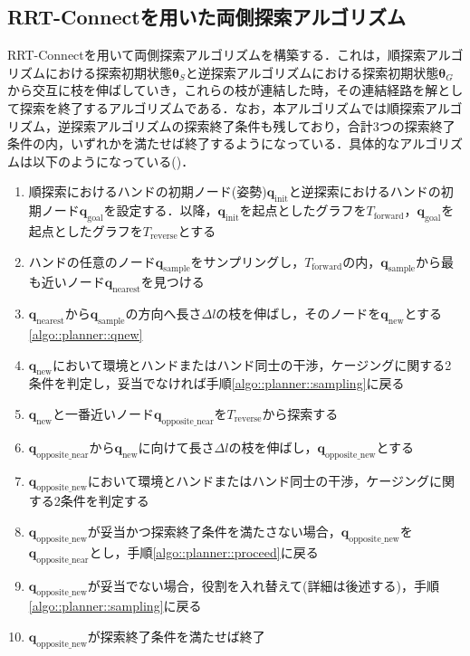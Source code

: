 \documentclass[a4paper,twoside,12pt,papersize, dvipdfmx]{iirthesis}
\begin{document}
{\subsection{RRT-Connectを用いた両側探索アルゴリズム}
RRT-Connect\cite{kuffner2000}を用いて両側探索アルゴリズムを構築する．これは，順探索アルゴリズムにおける探索初期状態$\bm {\theta}_S$と逆探索アルゴリズムにおける探索初期状態$\bm {\theta}_G$から交互に枝を伸ばしていき，これらの枝が連結した時，その連結経路を解として探索を終了するアルゴリズムである．なお，本アルゴリズムでは順探索アルゴリズム，逆探索アルゴリズムの探索終了条件も残しており，合計3つの探索終了条件の内，いずれかを満たせば終了するようになっている．具体的なアルゴリズムは以下のようになっている(\figref{})．
\begin{enumerate}
\item 順探索におけるハンドの初期ノード(姿勢)$\bm{q}_{\mathrm {init}}$と逆探索におけるハンドの初期ノード$\bm{q}_{\mathrm {goal}}$を設定する．以降，$\bm{q}_{\mathrm {init}}$を起点としたグラフを$T_{\mathrm {forward}}$，$\bm{q}_{\mathrm {goal}}$を起点としたグラフを$T_{\mathrm {reverse}}$とする
\item ハンドの任意のノード$\bm{q}_{\mathrm {sample}}$をサンプリングし，$T_{\mathrm {forward}}$の内，$\bm{q}_{\mathrm{sample}}$から最も近いノード$\bm{q}_{\mathrm{nearest}}$を見つける\label{algo::planner::sampling}
\item $\bm{q}_{\mathrm{nearest}}$から$\bm{q}_{\mathrm{sample}}$の方向へ長さ$\Delta l$の枝を伸ばし，そのノードを$\bm{q}_{\mathrm{new}}$とする \ref{algo::planner::qnew}
\item $\bm{q}_{\mathrm{new}}$において環境とハンドまたはハンド同士の干渉，ケージングに関する2条件を判定し，妥当でなければ手順\ref{algo::planner::sampling}に戻る
\item $\bm{q}_{\mathrm{new}}$と一番近いノード$\bm{q}_{\mathrm{opposite\_near}}$を$T_{\mathrm {reverse}}$から探索する\label{algo::planner::biasbegin}
\item $\bm{q}_{\mathrm{opposite\_near}}$から$\bm{q}_{\mathrm{new}}$に向けて長さ$\Delta l$の枝を伸ばし，$\bm{q}_{\mathrm{opposite\_new}}$とする\label{algo::planner::proceed}
\item $\bm{q}_{\mathrm{opposite\_new}}$において環境とハンドまたはハンド同士の干渉，ケージングに関する2条件を判定する
\item $\bm{q}_{\mathrm{opposite\_new}}$が妥当かつ探索終了条件を満たさない場合，$\bm{q}_{\mathrm{opposite\_new}}$を$\bm{q}_{\mathrm{opposite\_near}}$とし，手順\ref{algo::planner::proceed}に戻る\label{algo::planner::biasend}
\item $\bm{q}_{\mathrm{opposite\_new}}$が妥当でない場合，役割を入れ替えて(詳細は後述する)，手順\ref{algo::planner::sampling}に戻る \label{algo::planner::change}
\item $\bm{q}_{\mathrm{opposite\_new}}$が探索終了条件を満たせば終了\label{algo::planner::goalcond}
\end{enumerate}

}
\end{document}
